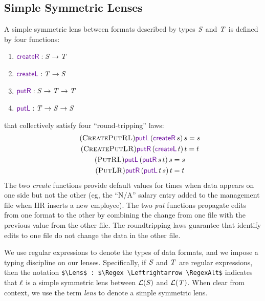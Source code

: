 \documentclass[acmsmall,screen,anonymous]{acmart}
\begin{document}
\subsection{Simple Symmetric Lenses}
A simple symmetric lens between formats described by types $\mathit{S}$
and $\mathit{T}$ 
is defined by four functions: 
\begin{enumerate}
\item $\CreateR \OfType \Regex \rightarrow \RegexAlt$
\item $\CreateL \OfType \RegexAlt \rightarrow \Regex$
\item $\PutR \OfType \Regex \rightarrow \RegexAlt \rightarrow \RegexAlt$
\item $\PutL \OfType \RegexAlt \rightarrow \Regex \rightarrow \Regex$
\end{enumerate}
\noindent
that collectively satisfy four ``round-tripping'' laws: 
\begin{gather}
  \tag{\CreatePutRL}
  \PutLOf{(\CreateROf{s})}{s} = s\\
  \tag{\CreatePutLR}
  \PutROf{(\CreateLOf{t})}{t} = t\\
  \tag{\PutRL}
  \PutLOf{(\PutROf{s}{t})}{s} = s\\
  \tag{\PutLR}
  \PutROf{(\PutLOf{t}{s})}{t} = t
\end{gather}
\noindent
The two \emph{create} functions provide default values for times when
data appears on one side but not the other (eg, the ``N/A'' salary
entry added to the management file when HR inserts a new employee).
The two \emph{put} functions propagate edits from one format to the
other by combining the change from one file with the previous value
from the other file. The roundtripping laws guarantee that identify edits to one file do
not change the data in the other file. 



We use regular expressions to denote the types of data formats, and we
impose a typing discipline on our lenses.  Specifically, if 
$\mathit{S}$ and $\mathit{T}$ are regular expressions, then the notation
\lstinline{$\Lens$ : $\Regex \Leftrightarrow \RegexAlt$} indicates that $\mathit{\ell}$
is a simple symmetric lens between $\mathcal{L}(\mathit{S})$ and
$\mathcal{L}(\mathit{T})$. 
When clear from context, we use the term \textit{lens} to denote a
simple symmetric lens.
\end{document}

